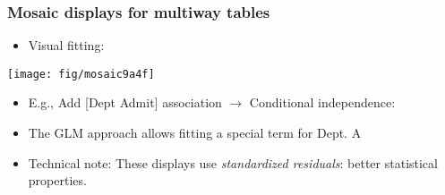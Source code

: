 \begin{frame}
\frametitle{Mosaic displays for multiway tables}
\begin{itemize}
\item Visual fitting:
\end{itemize}

 \begin{minipage}[c]{.55\dispwidth}
  \texttt{[image: fig/mosaic9a4f]}
 \end{minipage}%
 \hfill
 \begin{minipage}[c]{.44\dispwidth}
  \begin{itemize}
  \item E.g., Add [Dept Admit] association $\rightarrow$ Conditional independence: 
   \item The GLM approach allows fitting a special term for Dept. A
   \item Technical note:  These displays use \emph{standardized residuals}: better
    statistical properties. 
  \end{itemize}
 \end{minipage}
\end{frame}



